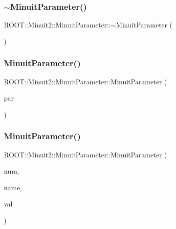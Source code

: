 \subsubsection{\texorpdfstring{$\sim$MinuitParameter()}{~MinuitParameter()}\hspace{0.1cm}{\footnotesize\ttfamily [1/3]}}
{\footnotesize\ttfamily R\+O\+O\+T\+::\+Minuit2\+::\+Minuit\+Parameter\+::$\sim$\+Minuit\+Parameter (\begin{DoxyParamCaption}{ }\end{DoxyParamCaption})\hspace{0.3cm}{\ttfamily [inline]}}

\mbox{\label{classROOT_1_1Minuit2_1_1MinuitParameter_a0ac95809b18c619597764fcfabcb70fe}} 
\subsubsection{\texorpdfstring{MinuitParameter()}{MinuitParameter()}\hspace{0.1cm}{\footnotesize\ttfamily [4/12]}}
{\footnotesize\ttfamily R\+O\+O\+T\+::\+Minuit2\+::\+Minuit\+Parameter\+::\+Minuit\+Parameter (\begin{DoxyParamCaption}\item[{const \mbox{\hyperlink{classROOT_1_1Minuit2_1_1MinuitParameter}{Minuit\+Parameter}} \&}]{par }\end{DoxyParamCaption})\hspace{0.3cm}{\ttfamily [inline]}}

\mbox{\label{classROOT_1_1Minuit2_1_1MinuitParameter_afa9a57b4990491316502a21e09b756bc}} 
\subsubsection{\texorpdfstring{MinuitParameter()}{MinuitParameter()}\hspace{0.1cm}{\footnotesize\ttfamily [5/12]}}
{\footnotesize\ttfamily R\+O\+O\+T\+::\+Minuit2\+::\+Minuit\+Parameter\+::\+Minuit\+Parameter (\begin{DoxyParamCaption}\item[{unsigned int}]{num,  }\item[{const std\+::string \&}]{name,  }\item[{double}]{val }\end{DoxyParamCaption})\hspace{0.3cm}{\ttfamily [inline]}}


